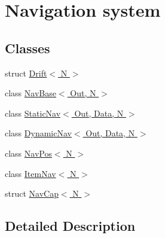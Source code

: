 \hypertarget{group__Navigation}{}\section{Navigation system}
\label{group__Navigation}
\subsection*{Classes}
\begin{DoxyCompactItemize}
\item 
struct \hyperlink{structDrift}{Drift$<$ N $>$}
\item 
class \hyperlink{classNavBase}{Nav\+Base$<$ Out, N $>$}
\item 
class \hyperlink{classStaticNav}{Static\+Nav$<$ Out, Data, N $>$}
\item 
class \hyperlink{classDynamicNav}{Dynamic\+Nav$<$ Out, Data, N $>$}
\item 
class \hyperlink{classNavPos}{Nav\+Pos$<$ N $>$}
\item 
class \hyperlink{classItemNav}{Item\+Nav$<$ N $>$}
\item 
struct \hyperlink{structNavCap}{Nav\+Cap$<$ N $>$}
\end{DoxyCompactItemize}


\subsection{Detailed Description}
